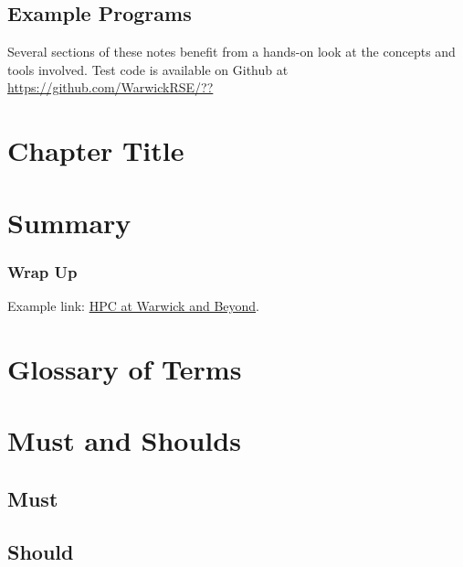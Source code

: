 \documentclass[12pt, openany]{book}
\begin{document}
\section{Example Programs}\label{sec:egCode}
Several sections of these notes benefit from a hands-on look at the concepts and tools involved. Test code is available on Github at \url{https://github.com/WarwickRSE/??}

\let\cleardoublepage\clearpage
\mainmatter

\chapter{Chapter Title}\label{chap:reference}


\chapter{Summary}
\subsection{Wrap Up}

Example link: \href{https://warwick.ac.uk/research/rtp/sc/rse/training/hpcbeyond}{HPC at Warwick and Beyond}. 

\immediate{}
\immediate{}

\chapter{Glossary of Terms}
\printnoidxglossary

\appendix

\chapter{Must and Shoulds}\label{sec:commandments}
\section{Must}
\begin{itemize}
    
\end{itemize}

\section{Should}
\begin{itemize}
    
\end{itemize}

\glsaddallunused
\end{document}
